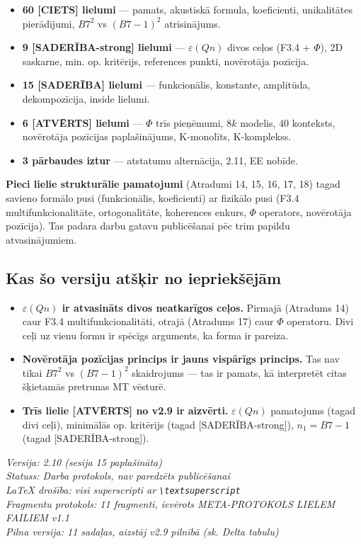 \documentclass[12pt,a4paper]{article}
\begin{document}
\begin{itemize}
    \item \textbf{60 [CIETS] lielumi} — pamats, akustiskā formula, koeficienti, unikalitātes pierādījumi, $B7^2$ vs $(B7-1)^2$ atrisinājums.
    \item \textbf{9 [SADERĪBA-strong] lielumi} — $\varepsilon(Qn)$ divos ceļos (F3.4 + $\Phi$), 2D saskarne, min. op. kritērijs, references punkti, novērotāja pozīcija.
    \item \textbf{15 [SADERĪBA] lielumi} — funkcionālis, konstante, amplitūda, dekompozīcija, inside lielumi.
    \item \textbf{6 [ATVĒRTS] lielumi} — $\Phi$ trīs pieņēmumi, $8k$ modelis, 40 konteksts, novērotāja pozīcijas paplašinājums, K-monolīts, K-komplekss.
    \item \textbf{3 pārbaudes iztur} — atstatumu alternācija, 2.11, EE nobīde.
\end{itemize}

\textbf{Pieci lielie strukturālie pamatojumi} (Atradumi 14, 15, 16, 17, 18) tagad savieno formālo pusi (funkcionālis, koeficienti) ar fizikālo pusi (F3.4 multifunkcionalitāte, ortogonalitāte, koherences enkurs, $\Phi$ operators, novērotāja pozīcija). Tas padara darbu gatavu publicēšanai pēc trim papildu atvasinājumiem.

\subsection*{Kas šo versiju atšķir no iepriekšējām}

\begin{itemize}
    \item \textbf{$\varepsilon(Qn)$ ir atvasināts divos neatkarīgos ceļos.} Pirmajā (Atradums 14) caur F3.4 multifunkcionalitāti, otrajā (Atradums 17) caur $\Phi$ operatoru. Divi ceļi uz vienu formu ir spēcīgs arguments, ka forma ir pareiza.
    \item \textbf{Novērotāja pozīcijas princips ir jauns vispārīgs princips.} Tas nav tikai $B7^2$ vs $(B7-1)^2$ skaidrojums — tas ir pamats, kā interpretēt citas šķietamās pretrunas MT vēsturē.
    \item \textbf{Trīs lielie [ATVĒRTS] no v2.9 ir aizvērti.} $\varepsilon(Qn)$ pamatojums (tagad divi ceļi), minimālās op. kritērijs (tagad [SADERĪBA-strong]), $n_1 = B7-1$ (tagad [SADERĪBA-strong]).
\end{itemize}

\vspace{1cm}

\noindent \textit{Versija: 2.10 (sesija 15 paplašināta)} \\
\noindent \textit{Statuss: Darba protokols, nav paredzēts publicēšanai} \\
\noindent \textit{LaTeX drošība: visi superscripti ar \texttt{\textbackslash textsuperscript}} \\
\noindent \textit{Fragmentu protokols: 11 fragmenti, ievērots META-PROTOKOLS LIELEM FAILIEM v1.1} \\
\noindent \textit{Pilna versija: 11 sadaļas, aizstāj v2.9 pilnībā (sk. Delta tabulu)}
\end{document}
